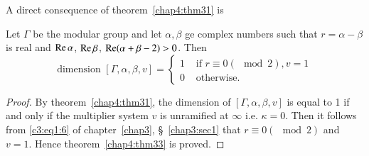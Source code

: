 A direct \pageoriginale consequence of theorem~\ref{chap4:thm31} is 

\begin{thm}\label{chap4:thm33}
Let $\Gamma$ be the modular group and let $\alpha, \beta$ ge complex
numbers such that $r=\alpha-\beta$ is real and $\operatorname{Re}\alpha$,
$\operatorname{Re}\beta$, $\operatorname{Re}(\alpha+\beta-2)>0$. Then
$$
\text{dimension } [\Gamma, \alpha, \beta,v]=\begin{cases}
1 & \text{ if } r \equiv 0 (\mod 2), v=1\\
0 & \text{ otherwise}.
\end{cases}
$$
\end{thm}

\begin{proof}
By theorem~\ref{chap4:thm31}, the dimension of $[\Gamma, \alpha, \beta, v]$ is equal
to 1 if and only if the multiplier system $v$ is unramified at
$\infty$ i.e. $\kappa=0$. Then it follows from \eqref{c3:eq1:6} of 
chapter~\ref{chap3}, \S~\ref{chap3:sec1} that $r\equiv 0(\mod 2)$ 
and $v=1$. Hence theorem~\ref{chap4:thm33} is proved.
\end{proof}

